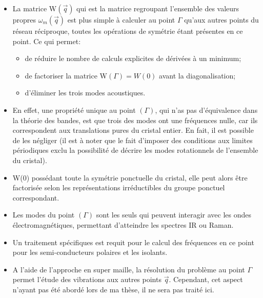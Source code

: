 \begin{itemize}
	\item[\textbullet] La matrice W$(\overrightarrow{q})$ qui est la matrice regroupant l'ensemble des valeurs propres $\omega_{m}(\overrightarrow{q})$ est plus simple à calculer au point $\Gamma$ qu'aux autres points du réseau réciproque, toutes les opérations de symétrie étant présentes en ce point. Ce qui permet:
	\begin{itemize}
	\item de réduire le nombre de calculs explicites de dérivées à un minimum;
	\item de factoriser la matrice W$(\Gamma) = W(0)$ avant la diagonalisation;
	\item d'éliminer les trois modes acoustiques.	
	\end{itemize}
	
	\bigskip
	
\item[\textbullet] En effet, une propriété unique au point $(\Gamma)$, qui n'as pas d'équivalence  dans la théorie des bandes, est que trois des modes ont une fréquences nulle, car ils correspondent aux translations pures du cristal entier. En fait, il est possible de les négliger (il est à noter que le fait d'imposer des conditions aux limites périodiques exclu la possibilité de décrire les modes rotationnels de l'ensemble du cristal).
\bigskip

\item[\textbullet] W(0) possédant toute la symétrie ponctuelle du cristal, elle peut alors être factorisée selon les représentations irréductibles du groupe ponctuel correspondant.
\bigskip

\item[\textbullet] Les modes du point $(\Gamma)$ sont les seuls qui peuvent interagir avec les ondes électromagnétiques, permettant d'atteindre les spectres IR ou Raman. 
\bigskip

\item[\textbullet] Un traitement spécifiques est requit pour le calcul des fréquences en ce point pour les semi-conducteurs polaires et les isolants. 
\bigskip

\item[\textbullet] A l'aide de l'approche en super maille, la résolution du problème au point $\Gamma$ permet l'étude des vibrations aux autres points $\overrightarrow{q}$. Cependant, cet aspect n'ayant pas été abordé lors de ma thèse, il ne sera pas traité ici. 
\end{itemize}



